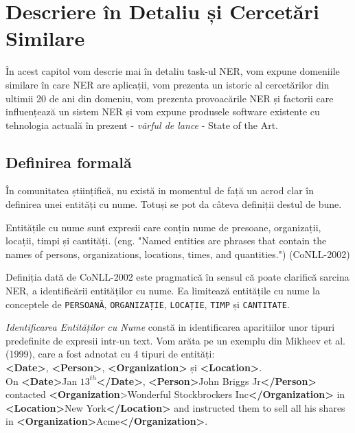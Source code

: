 \chapter{Descriere în Detaliu și Cercetări Similare}
\label{chapter:history}

În acest capitol vom descrie mai în detaliu task-ul NER, vom expune domeniile similare în care NER are aplicații, vom prezenta un istoric al cercetărilor din ultimii 20 de ani din domeniu, vom prezenta provoacările NER și factorii care influențează un sistem NER și vom expune produsele software existente cu tehnologia actuală în prezent - \textit{vârful de lance} - State of the Art.

\section{Definirea formală}

În comunitatea științifică, nu există in momentul de față un acrod clar în definirea unei entități cu nume. Totuși se pot da câteva definiții destul de bune.

Entitățile cu nume sunt expresii care conțin nume de presoane, organizații, locații, timpi și cantități. (eng. "Named entities are phrases that contain the names of persons, organizations, locations, times, and quantities.") (CoNLL-2002)

Definiția dată de CoNLL-2002 este pragmatică în sensul că poate clarifică sarcina NER, a identificării entităților cu nume. Ea limitează entitățile cu nume la conceptele de \texttt{PERSOANĂ}, \texttt{ORGANIZAȚIE}, \texttt{LOCAȚIE}, \texttt{TIMP} și \texttt{CANTITATE}.


\textit{Identificarea Entităților cu Nume} constă in identificarea aparitiilor unor tipuri predefinite de expresii intr-un text. Vom arăta pe un exemplu din Mikheev et al. (1999)\cite{mikheev1999}, care a fost adnotat cu 4 tipuri de entități:\\

\textbf{<Date>}, \textbf{<Person>}, \textbf{<Organization>} și \textbf{<Location>}.\\


On \textbf{<Date>}Jan $13^{th}$\textbf{</Date>}, \textbf{<Person>}John Briggs Jr\textbf{</Person>} contacted
\textbf{<Organization}>Wonderful Stockbrockers Inc\textbf{</Organization>} in\textbf{ <Location>}New
York\textbf{</Location>} and instructed them to sell all his shares in
\textbf{<Organization>}Acme\textbf{</Organization>}.\\

